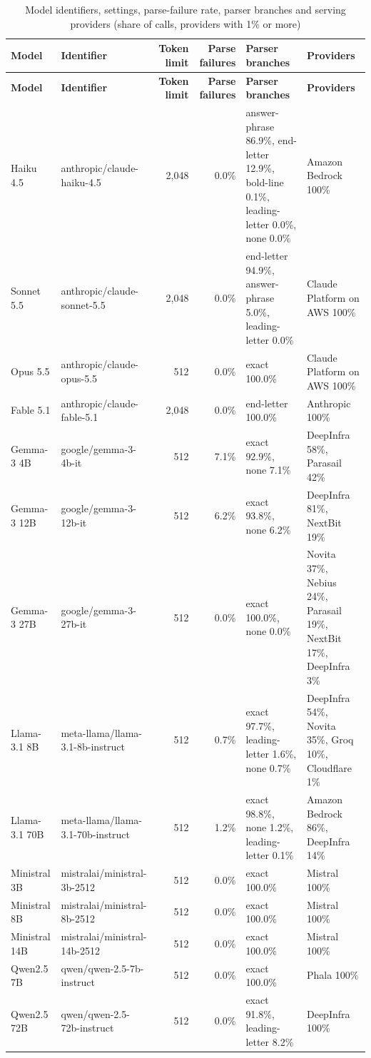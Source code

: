 \documentclass[10pt,a4paper]{article}
\begin{document}
\begin{tiny}
\setlength{\tabcolsep}{2pt}
\begin{longtable}{p{1.6cm}p{3.2cm}rrp{3.8cm}p{2.6cm}}
\caption{Model identifiers, settings, parse-failure rate, parser branches and serving providers (share of calls, providers with 1\% or more)}\\
\toprule
\textbf{Model} & \textbf{Identifier} & \textbf{Token limit} & \textbf{Parse failures} & \textbf{Parser branches} & \textbf{Providers} \\
\midrule
\endfirsthead
\toprule
\textbf{Model} & \textbf{Identifier} & \textbf{Token limit} & \textbf{Parse failures} & \textbf{Parser branches} & \textbf{Providers} \\
\midrule
\endhead
\bottomrule
\endfoot
Haiku 4.5 & anthropic/claude-haiku-4.5 & 2,048 & 0.0\% & answer-phrase 86.9\%, end-letter 12.9\%, bold-line 0.1\%, leading-letter 0.0\%, none 0.0\% & Amazon Bedrock 100\% \\
Sonnet 5.5 & anthropic/claude-sonnet-5.5 & 2,048 & 0.0\% & end-letter 94.9\%, answer-phrase 5.0\%, leading-letter 0.0\% & Claude Platform on AWS 100\% \\
Opus 5.5 & anthropic/claude-opus-5.5 & 512 & 0.0\% & exact 100.0\% & Claude Platform on AWS 100\% \\
Fable 5.1 & anthropic/claude-fable-5.1 & 2,048 & 0.0\% & end-letter 100.0\% & Anthropic 100\% \\
Gemma-3 4B & google/gemma-3-4b-it & 512 & 7.1\% & exact 92.9\%, none 7.1\% & DeepInfra 58\%, Parasail 42\% \\
Gemma-3 12B & google/gemma-3-12b-it & 512 & 6.2\% & exact 93.8\%, none 6.2\% & DeepInfra 81\%, NextBit 19\% \\
Gemma-3 27B & google/gemma-3-27b-it & 512 & 0.0\% & exact 100.0\%, none 0.0\% & Novita 37\%, Nebius 24\%, Parasail 19\%, NextBit 17\%, DeepInfra 3\% \\
Llama-3.1 8B & meta-llama/llama-3.1-8b-instruct & 512 & 0.7\% & exact 97.7\%, leading-letter 1.6\%, none 0.7\% & DeepInfra 54\%, Novita 35\%, Groq 10\%, Cloudflare 1\% \\
Llama-3.1 70B & meta-llama/llama-3.1-70b-instruct & 512 & 1.2\% & exact 98.8\%, none 1.2\%, leading-letter 0.1\% & Amazon Bedrock 86\%, DeepInfra 14\% \\
Ministral 3B & mistralai/ministral-3b-2512 & 512 & 0.0\% & exact 100.0\% & Mistral 100\% \\
Ministral 8B & mistralai/ministral-8b-2512 & 512 & 0.0\% & exact 100.0\% & Mistral 100\% \\
Ministral 14B & mistralai/ministral-14b-2512 & 512 & 0.0\% & exact 100.0\% & Mistral 100\% \\
Qwen2.5 7B & qwen/qwen-2.5-7b-instruct & 512 & 0.0\% & exact 100.0\% & Phala 100\% \\
Qwen2.5 72B & qwen/qwen-2.5-72b-instruct & 512 & 0.0\% & exact 91.8\%, leading-letter 8.2\% & DeepInfra 100\% \\
\end{longtable}
\end{tiny}
\end{document}
